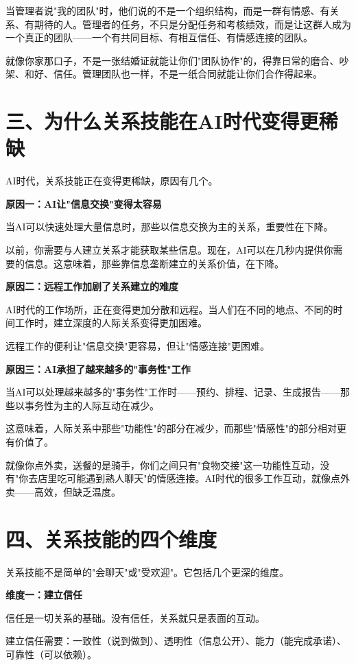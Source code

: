 当管理者说"我的团队"时，他们说的不是一个组织结构，而是一群有情感、有关系、有期待的人。管理者的任务，不只是分配任务和考核绩效，而是让这群人成为一个真正的团队——一个有共同目标、有相互信任、有情感连接的团队。

就像你家那口子，不是一张结婚证就能让你们"团队协作"的，得靠日常的磨合、吵架、和好、信任。管理团队也一样，不是一纸合同就能让你们合作得起来。

\section{三、为什么关系技能在AI时代变得更稀缺}


AI时代，关系技能正在变得更稀缺，原因有几个。

\textbf{原因一：AI让"信息交换"变得太容易}

当AI可以快速处理大量信息时，那些以信息交换为主的关系，重要性在下降。

以前，你需要与人建立关系才能获取某些信息。现在，AI可以在几秒内提供你需要的信息。这意味着，那些靠信息垄断建立的关系价值，在下降。

\textbf{原因二：远程工作加剧了关系建立的难度}

AI时代的工作场所，正在变得更加分散和远程。当人们在不同的地点、不同的时间工作时，建立深度的人际关系变得更加困难。

远程工作的便利让"信息交换"更容易，但让"情感连接"更困难。

\textbf{原因三：AI承担了越来越多的"事务性"工作}

当AI可以处理越来越多的"事务性"工作时——预约、排程、记录、生成报告——那些以事务性为主的人际互动在减少。

这意味着，人际关系中那些"功能性"的部分在减少，而那些"情感性"的部分相对更有价值了。

就像你点外卖，送餐的是骑手，你们之间只有"食物交接"这一功能性互动，没有"你去店里吃可能遇到熟人聊天"的情感连接。AI时代的很多工作互动，就像点外卖——高效，但缺乏温度。

\section{四、关系技能的四个维度}


关系技能不是简单的"会聊天"或"受欢迎"。它包括几个更深的维度。

\textbf{维度一：建立信任}

信任是一切关系的基础。没有信任，关系就只是表面的互动。

建立信任需要：一致性（说到做到）、透明性（信息公开）、能力（能完成承诺）、可靠性（可以依赖）。

